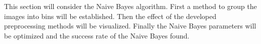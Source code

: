 This section will consider the Naive Bayes algorithm.
First a method to group the images into bins will be established.
Then the effect of the developed preprocessing methods will be visualized. 
Finally the Naive Bayes parameters will be optimized and the success rate of the Naive Bayes found.